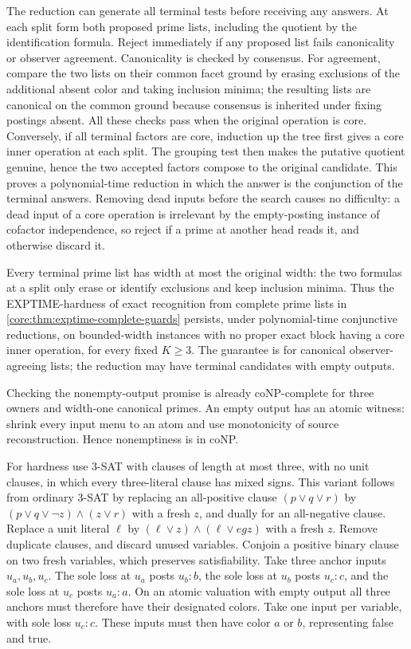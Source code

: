 The reduction can generate all terminal tests before
receiving any answers. At each split form both proposed
prime lists, including the quotient by the identification
formula. Reject immediately if any proposed list fails
canonicality or observer agreement. Canonicality is
checked by consensus. For agreement, compare the two
lists on their common facet ground by erasing exclusions
of the additional absent color and taking inclusion
minima; the resulting lists are canonical on the common
ground because consensus is inherited under fixing
postings absent. All these checks pass when the original
operation is core. Conversely, if all terminal factors
are core, induction up the tree first gives a core inner
operation at each split. The grouping test then makes
the putative quotient genuine, hence the two accepted
factors compose to the original candidate. This proves
a polynomial-time reduction in which the answer is
the conjunction of the terminal answers. Removing
dead inputs before the search causes no difficulty:
a dead input of a core operation is irrelevant by the
empty-posting instance of cofactor independence, so
reject if a prime at another head reads it, and
otherwise discard it.

Every terminal prime list has width at most the original
width: the two formulas at a split only erase or identify
exclusions and keep inclusion minima. Thus the
EXPTIME-hardness of exact recognition from complete
prime lists in \cref{core:thm:exptime-complete-guards}
persists, under polynomial-time conjunctive reductions,
on bounded-width instances with no proper exact block
having a core inner operation, for every fixed $K\ge3$.
The guarantee is for canonical observer-agreeing lists;
the reduction may have terminal candidates with empty
outputs.

Checking the nonempty-output promise is already
coNP-complete for three owners and width-one canonical
primes. An empty output has an atomic witness: shrink
every input menu to an atom and use monotonicity of
source reconstruction. Hence nonemptiness is in coNP.

For hardness use 3-SAT with clauses of length at most
three, with no unit clauses, in which every three-literal
clause has mixed signs. This variant follows from ordinary 3-SAT by
replacing an all-positive clause $(p\lor q\lor r)$ by
$(p\lor q\lor\neg z)\land(z\lor r)$ with a fresh $z$,
and dually for an all-negative clause. Replace a unit
literal $\ell$ by $(\ell\lor z)\land(\ell\lor
eg z)$
with a fresh $z$. Remove duplicate clauses, and discard unused variables.
Conjoin a positive binary clause on two fresh variables,
which preserves satisfiability. Take three
anchor inputs $u_a,u_b,u_c$. The sole loss at $u_a$
posts $u_b:b$, the sole loss at $u_b$ posts $u_c:c$,
and the sole loss at $u_c$ posts $u_a:a$. On an atomic
valuation with empty output all three anchors must
therefore have their designated colors. Take one
input per variable, with sole loss $u_c:c$. These
inputs must then have color $a$ or $b$, representing
false and true.

